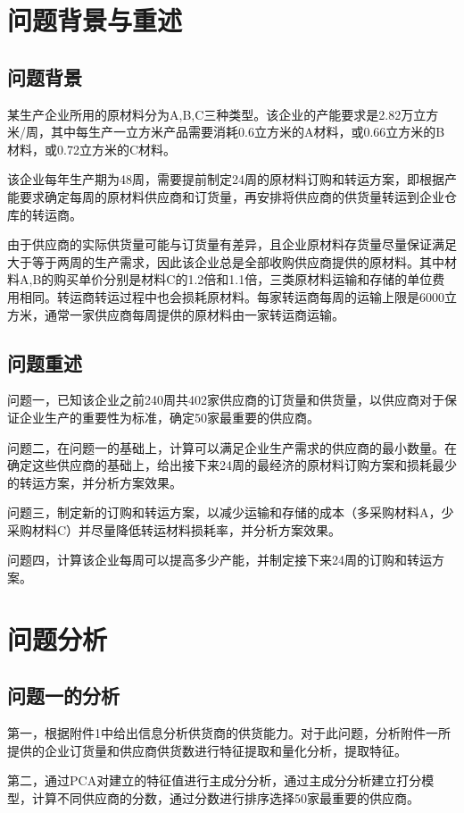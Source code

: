 \documentclass[UTF8]{ctexart}
\begin{document}
\section{问题背景与重述}
\subsection{问题背景}
某生产企业所用的原材料分为A,B,C三种类型。该企业的产能要求是2.82万立方米/周，其中每生产一立方米产品需要消耗0.6立方米的A材料，或0.66立方米的B材料，或0.72立方米的C材料。

该企业每年生产期为48周，需要提前制定24周的原材料订购和转运方案，即根据产能要求确定每周的原材料供应商和订货量，再安排将供应商的供货量转运到企业仓库的转运商。

由于供应商的实际供货量可能与订货量有差异，且企业原材料存货量尽量保证满足大于等于两周的生产需求，因此该企业总是全部收购供应商提供的原材料。其中材料A,B的购买单价分别是材料C的1.2倍和1.1倍，三类原材料运输和存储的单位费用相同。转运商转运过程中也会损耗原材料。每家转运商每周的运输上限是6000立方米，通常一家供应商每周提供的原材料由一家转运商运输。

\subsection{问题重述}
问题一，已知该企业之前240周共402家供应商的订货量和供货量，以供应商对于保证企业生产的重要性为标准，确定50家最重要的供应商。

问题二，在问题一的基础上，计算可以满足企业生产需求的供应商的最小数量。在确定这些供应商的基础上，给出接下来24周的最经济的原材料订购方案和损耗最少的转运方案，并分析方案效果。

问题三，制定新的订购和转运方案，以减少运输和存储的成本（多采购材料A，少采购材料C）并尽量降低转运材料损耗率，并分析方案效果。

问题四，计算该企业每周可以提高多少产能，并制定接下来24周的订购和转运方案。

\section{问题分析}
\subsection{问题一的分析}

第一，根据附件1中给出信息分析供货商的供货能力。对于此问题，分析附件一所提供的企业订货量和供应商供货数进行特征提取和量化分析，提取特征。

第二，通过PCA对建立的特征值进行主成分分析，通过主成分分析建立打分模型，计算不同供应商的分数，通过分数进行排序选择50家最重要的供应商。
\end{document}

